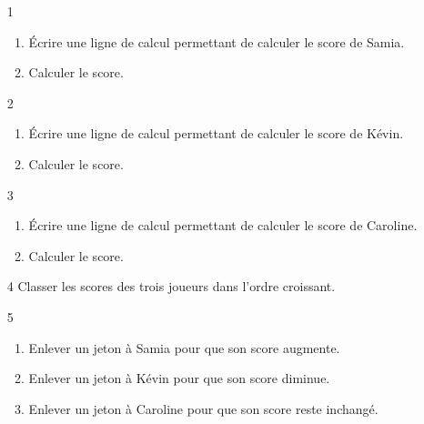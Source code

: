 \documentclass[11pt]{article}
\begin{document}
    \begin{enumerate}
    \item[1]
          \begin{enumerate}
          \item Écrire une ligne de calcul permettant de calculer le score de Samia.
          \item Calculer le score.
          \end{enumerate}
    \item[2] 
          \begin{enumerate}
          \item Écrire une ligne de calcul permettant de calculer le score de Kévin.
          \item Calculer le score.
          \end{enumerate}
    \item[3] 
          \begin{enumerate}
          \item Écrire une ligne de calcul permettant de calculer le score de Caroline.
          \item Calculer le score.
          \end{enumerate}
    \item[4] Classer les scores des trois joueurs dans l'ordre croissant.
    \item[5]   
          \begin{enumerate}
          \item Enlever un jeton à Samia pour que son score augmente.
          \item Enlever un jeton à Kévin pour que son score diminue.
          \item Enlever un jeton à Caroline pour que son score reste inchangé.
          \end{enumerate}
    \end{enumerate}
\end{document}
